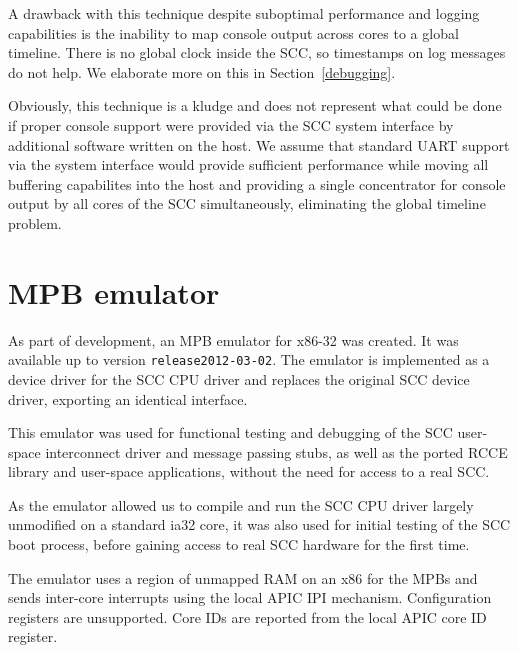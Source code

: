 \documentclass[a4paper,twoside]{report} %
\begin{document}
A drawback with this technique despite suboptimal performance and
logging capabilities is the inability to map console output across
cores to a global timeline. There is no global clock inside the SCC,
so timestamps on log messages do not help. We elaborate more on this
in Section~\ref{debugging}.

Obviously, this technique is a kludge and does not represent what
could be done if proper console support were provided via the SCC
system interface by additional software written on the host. We assume
that standard UART support via the system interface would provide
sufficient performance while moving all buffering capabilites into the
host and providing a single concentrator for console output by all
cores of the SCC simultaneously, eliminating the global timeline
problem.

\section{MPB emulator}

As part of development, an MPB emulator for x86-32 was created. It was
available up to version \verb+release2012-03-02+. The emulator is
implemented as a device driver for the SCC CPU driver and replaces the
original SCC device driver, exporting an identical interface.

This emulator was used for functional testing and debugging of the SCC
user-space interconnect driver and message passing stubs, as well as
the ported RCCE library and user-space applications, without the
need for access to a real SCC.

As the emulator allowed us to compile and run the SCC CPU driver
largely unmodified on a standard ia32 core, it was also used for
initial testing of the SCC boot process, before gaining access to real
SCC hardware for the first time.

The emulator uses a region of unmapped RAM on an x86 for the
MPBs and sends inter-core interrupts using the local APIC IPI
mechanism. Configuration registers are unsupported. Core IDs are
reported from the local APIC core ID register.

 

\end{document}
